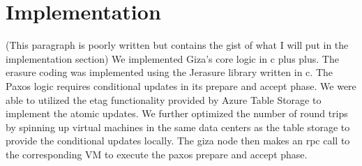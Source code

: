 \section{Implementation}
(This paragraph is poorly written but contains the gist of what I will put in the implementation section)
We implemented Giza’s core logic in c plus plus. The erasure coding was implemented using the Jerasure library written in c. The Paxos logic requires conditional updates in its prepare and accept phase. We were able to utilized the etag functionality provided by Azure Table Storage to implement the atomic updates. We further optimized the number of round trips by spinning up virtual machines in the same data centers as the table storage to provide the conditional updates locally. The giza node then makes an rpc call to the corresponding VM to execute the paxos prepare and accept phase. 

